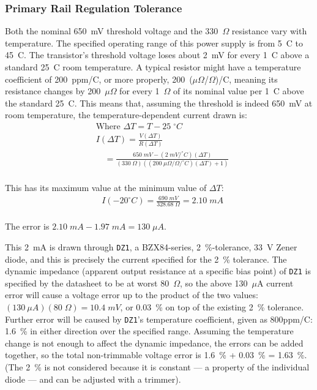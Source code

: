 \begin{multicols}{2}
\subsubsection{Primary Rail Regulation Tolerance}
Both the nominal 650~mV threshold voltage and the 330~$\Omega$ resistance
vary with temperature. The specified operating range of this power supply
is from 5~\dg C to 45~\dg C. The transistor's threshold voltage loses about
2~mV for every 1~\dg C above a standard 25~\dg C room temperature. 
A typical resistor might have a temperature coefficient of 200~ppm/\dg C,
or more properly, 200~($\mu\Omega$/$\Omega$)/\dg C,
meaning its resistance changes by 200~$\mu\Omega$ for every 1~$\Omega$
of its nominal value per 1~\dg C above the standard 25~\dg C.
This means that, assuming the threshold is indeed 650~mV at room temperature,
the temperature-dependent current drawn is:
\small
\begin{align*}
    & \textrm{Where } \Delta T = T - 25\;^\circ C\\
    &I(\Delta T) = \frac{V(\Delta T)}{R(\Delta T)} \\
    &\quad= \frac{650\;mV - (2\;mV/^\circ C)(\Delta T)}
      {(330\;\Omega)((200\;\mu\Omega/\Omega/^\circ C)(\Delta T) + 1)} \\
\end{align*}
\normalsize

This has its maximum value at the minimum value of $\Delta T$:
\small
\begin{align*}
    &I(-20^\circ C) = \frac{690\;mV}{328.68\;\Omega} = 2.10\;mA \\
\end{align*}
\normalsize

The error is $2.10\;mA - 1.97\;mA = 130\;\mu A$.

This 2~mA is drawn through \texttt{DZ1}, a BZX84-series, 2~\%-tolerance, 33~V
Zener diode, and this is precisely the current specified for the 2~\% tolerance.
The dynamic impedance (apparent output resistance at a specific bias point) of
\texttt{DZ1} is specified by the datasheet to be at worst 80~$\Omega$,
so the above
130~$\mu$A current error will cause a voltage error up to the product of the
two values:
$(130~\mu A)(80\;\Omega) = 10.4\;mV$, or 0.03~\% on top of the existing
2~\% tolerance. Further
error will be caused by \texttt{DZ1}'s temperature coefficient, given as
800ppm/\dg C: 1.6~\% in either direction over the specified range.
Assuming the temperature change is not enough to affect the dynamic
impedance, the errors can be added together, so
the total
non-trimmable voltage error is 1.6~\% + 0.03~\% = 1.63~\%. (The 2~\% is not
considered because it is constant --- a property of the individual diode ---
and can be adjusted with a trimmer).


\end{multicols}
